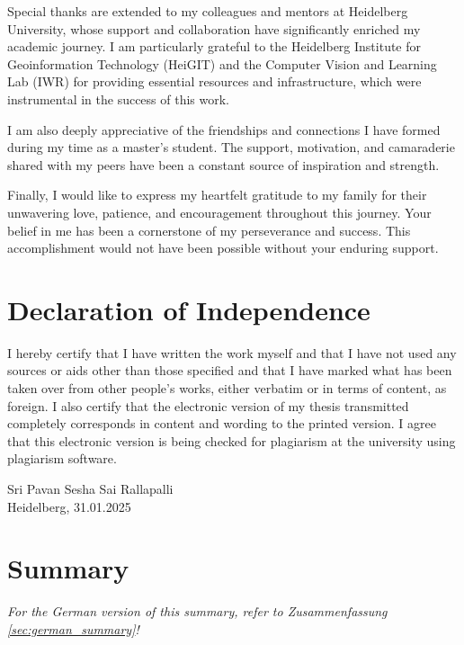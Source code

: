 \documentclass[
    13pt, %
    a4paper, %
    listof=totoc, %
    bibliography=totoc, %
    index=totoc, %
    headsepline
]{scrreprt}
\begin{document}
Special thanks are extended to my colleagues and mentors at Heidelberg University, whose support and collaboration have significantly enriched my academic journey. I am particularly grateful to the Heidelberg Institute for Geoinformation Technology (HeiGIT) and the Computer Vision and Learning Lab (IWR) for providing essential resources and infrastructure, which were instrumental in the success of this work.

I am also deeply appreciative of the friendships and connections I have formed during my time as a master’s student. The support, motivation, and camaraderie shared with my peers have been a constant source of inspiration and strength.

Finally, I would like to express my heartfelt gratitude to my family for their unwavering love, patience, and encouragement throughout this journey. Your belief in me has been a cornerstone of my perseverance and success. This accomplishment would not have been possible without your enduring support.


\newpage
\section*{\LARGE Declaration of Independence}
\thispagestyle{plain}

I hereby certify that I have written the work myself and that I have not used any sources
or aids other than those specified and that I have marked what has been taken over from
other people’s works, either verbatim or in terms of content, as foreign. I also certify
that the electronic version of my thesis transmitted completely corresponds in content
and wording to the printed version. I agree that this electronic version is being checked
for plagiarism at the university using plagiarism software.

\vspace*{50pt}

\noindent
Sri Pavan Sesha Sai Rallapalli\\
Heidelberg, 31.01.2025

\newpage

\pagestyle{plain}
\section*{\LARGE Summary}

\noindent \textit{For the German version of this summary, refer to Zusammenfassung \autoref{sec:german_summary}!}
\end{document}
